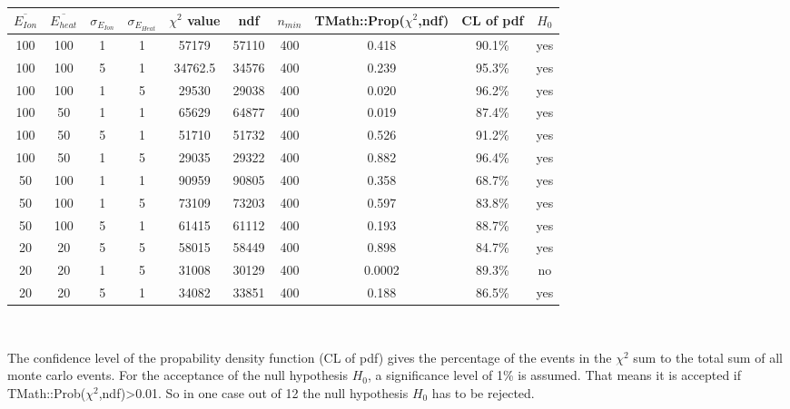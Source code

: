 \documentclass[10pt, a4paper]{article}
\begin{document}
\begin{minipage}{\textwidth}

\begin{tabular}{|c|c|c|c|c|c|c|c|c|c|} \hline
$\overline{E_{Ion}}$ & $\overline{E_{heat}}$ & $\sigma_{E_{Ion}}$ & $\sigma_{E_{Heat}}$ & $\chi^2$ value & ndf & $n_{min}$ & TMath::Prop($\chi^2$,ndf) & CL of pdf &  $H_0$ \\ \hline \hline
100 & 100 & 1 & 1 & 57179 & 57110 & 400 & 0.418 & 90.1\% &  yes \\ \hline
100 & 100 & 5 & 1 & 34762.5 & 34576 & 400 & 0.239 & 95.3\% & yes \\ \hline
100 & 100 & 1 & 5 & 29530 & 29038 & 400 & 0.020 & 96.2\%  & yes \\ \hline
100 & 50 & 1 & 1 & 65629 & 64877 & 400 & 0.019 & 87.4\%  & yes \\ \hline
100 & 50 & 5 & 1 & 51710 & 51732 & 400 & 0.526 & 91.2\% & yes \\ \hline
100 & 50 & 1 & 5 & 29035 & 29322 & 400 & 0.882 & 96.4\% & yes \\ \hline
50 & 100 & 1 & 1 & 90959 & 90805 & 400 & 0.358 & 68.7\% & yes \\ \hline
50 & 100 & 1 & 5 & 73109 & 73203 & 400 & 0.597 & 83.8\% & yes \\ \hline
50 & 100 & 5 & 1 & 61415 & 61112 & 400 & 0.193 & 88.7\% & yes \\ \hline
20 & 20 & 5 & 5 & 58015 & 58449 & 400 & 0.898 & 84.7\% & yes \\ \hline
20 & 20 & 1 & 5 & 31008 & 30129 & 400 & 0.0002 & 89.3\% & no \\ \hline
20 & 20 & 5 & 1 & 34082 & 33851 & 400 & 0.188 & 86.5\% & yes \\ \hline

\end{tabular} \\[1cm]

\end{minipage}

The confidence level of the propability density function (CL of pdf) gives the percentage of the events in the $\chi^2$ sum to the total sum of all monte carlo events.
For the acceptance of the null hypothesis $H_0$, a significance level of 1\% is assumed. That means it is accepted if TMath::Prob($\chi^2$,ndf)>0.01.
So in one case out of 12 the null hypothesis $H_0$ has to be rejected. 
\end{document}
